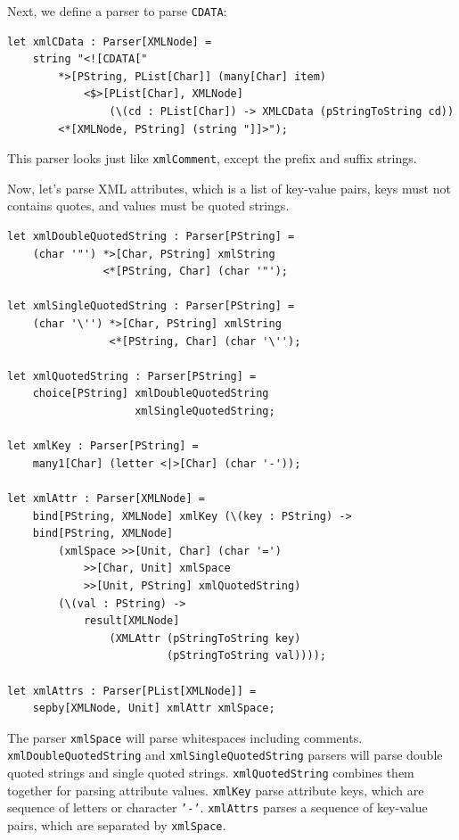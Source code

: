 Next, we define a parser to parse \texttt{CDATA}:

\begin{lstlisting}
let xmlCData : Parser[XMLNode] =
    string "<![CDATA["
        *>[PString, PList[Char]] (many[Char] item)
            <$>[PList[Char], XMLNode]
                (\(cd : PList[Char]) -> XMLCData (pStringToString cd))
        <*[XMLNode, PString] (string "]]>");
\end{lstlisting}

This parser looks just like \texttt{xmlComment}, except the prefix and suffix strings.

Now, let's parse XML attributes, which is a list of key-value pairs, keys must not contains quotes, and values must be quoted strings.

\begin{lstlisting}
let xmlDoubleQuotedString : Parser[PString] =
    (char '"') *>[Char, PString] xmlString
               <*[PString, Char] (char '"');

let xmlSingleQuotedString : Parser[PString] =
    (char '\'') *>[Char, PString] xmlString
                <*[PString, Char] (char '\'');

let xmlQuotedString : Parser[PString] =
    choice[PString] xmlDoubleQuotedString
                    xmlSingleQuotedString;

let xmlKey : Parser[PString] =
    many1[Char] (letter <|>[Char] (char '-'));

let xmlAttr : Parser[XMLNode] =
    bind[PString, XMLNode] xmlKey (\(key : PString) ->
    bind[PString, XMLNode]
        (xmlSpace >>[Unit, Char] (char '=')
            >>[Char, Unit] xmlSpace
            >>[Unit, PString] xmlQuotedString)
        (\(val : PString) ->
            result[XMLNode]
                (XMLAttr (pStringToString key)
                         (pStringToString val))));

let xmlAttrs : Parser[PList[XMLNode]] =
    sepby[XMLNode, Unit] xmlAttr xmlSpace;
\end{lstlisting}

The parser \texttt{xmlSpace} will parse whitespaces including comments. \texttt{xmlDoubleQuotedString} and \texttt{xmlSingleQuotedString} parsers will parse double quoted strings and single quoted strings. \texttt{xmlQuotedString} combines them together for parsing attribute values. \texttt{xmlKey} parse attribute keys, which are sequence of letters or character \texttt{'-'}. \texttt{xmlAttrs} parses a sequence of key-value pairs, which are separated by \texttt{xmlSpace}.

